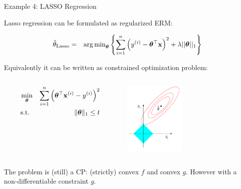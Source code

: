 \begin{vbframe}{Example 4: LASSO Regression}
	
Lasso regression can be formulated as regularized ERM: 

\begin{eqnarray*}  
		\hat{\theta}_{\text{Lasso}} &=&  \operatorname{arg\,min}_{\bm{\theta}} \left\{ \sum\limits_{i=1}^n \left(y^{(i)} - \bm{\theta}^\top\mathbf{x}\right)^2 + \lambda ||\bm{\theta}||_1 \right\} 
\end{eqnarray*}

Equivalently it can be written as constrained optimization problem: 

	\vspace*{-0.2cm}
	\begin{columns}[T] %
		\begin{column}{.48\textwidth}
			\begin{eqnarray*}
				\min_{\bm{\theta}} && \sum_{i = 1}^n \left(\bm{\theta}^\top \mathbf{x}^{(i)} - y^{(i)}\right)^2 \\
				\text{s.t. } && \|\bm{\theta}\|_1 \le t
			\end{eqnarray*}
		\end{column}

		\begin{column}{.48\textwidth}
			\begin{center}
				\includegraphics[width=0.45\textwidth, keepaspectratio]{figure_man/lasso.png} 
			\end{center}
		\end{column}
	\end{columns}	

The problem is (still) a CP: (strictly) convex $f$ and convex $g$. However with a non-differentiable constraint $g$.

\end{vbframe}

